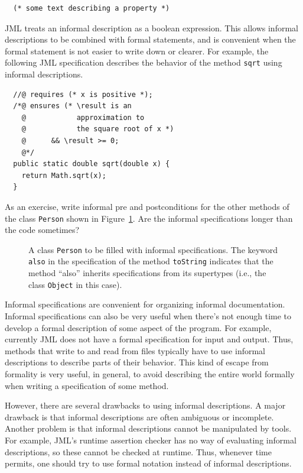 \documentclass[twocolumn]{article}
\begin{document}
\begin{verbatim}
  (* some text describing a property *)
\end{verbatim}

JML treats an informal description as a boolean expression.
This allows informal descriptions to be combined with formal
statements, and is convenient when the formal statement is not easier
to write down or clearer.
For example, the following JML specification describes the behavior of
the method \texttt{sqrt} using informal descriptions.

\begin{verbatim}
  //@ requires (* x is positive *);
  /*@ ensures (* \result is an
    @            approximation to
    @            the square root of x *)
    @      && \result >= 0;
    @*/
  public static double sqrt(double x) {
    return Math.sqrt(x);
  }
\end{verbatim}

As an exercise, write informal pre and postconditions for the other
methods of the class \texttt{Person} shown in
Figure~\ref{fig-write-informal-spec}. Are the informal specifications
longer than the code sometimes?

\begin{figure}

\caption{A class \texttt{Person} to be filled with informal specifications.
  The keyword \texttt{also} in the specification of the method
  \texttt{toString} indicates that the method ``also'' inherits
  specifications from its supertypes (i.e., the class \texttt{Object}
  in this case).}
\label{fig-write-informal-spec}
\end{figure}

Informal specifications are convenient for organizing informal
documentation.  Informal specifications can also be very useful when
there's not enough time to develop a formal description of some aspect
of the program.  For example, currently JML does not have a formal
specification for input and output.  Thus, methods that write to and read
from files typically have to use informal descriptions to describe
parts of their behavior.  This kind of escape from formality is very
useful, in general, to avoid describing the entire world formally when
writing a specification of some method.

However, there are several drawbacks to using informal descriptions.
A major drawback is that informal descriptions are often ambiguous or
incomplete.  Another problem is that informal descriptions cannot be
manipulated by tools.  For example, JML's runtime assertion checker
has no way of evaluating informal descriptions, so these cannot be
checked at runtime.  Thus, whenever time permits, one should try to
use formal notation instead of informal descriptions.
\end{document}

